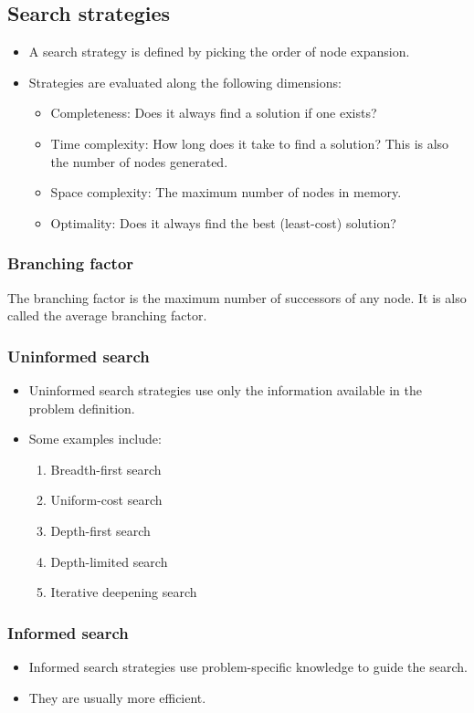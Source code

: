 \documentclass[11pt]{article}
\begin{document}
\subsection{Search strategies}
\label{sec:org9131353}
\begin{itemize}
\item A search strategy is defined by picking the order of node expansion.
\item Strategies are evaluated along the following dimensions:
\begin{itemize}
\item Completeness: Does it always find a solution if one exists?
\item Time complexity: How long does it take to find a solution? This is also the number of nodes generated.
\item Space complexity: The maximum number of nodes in memory.
\item Optimality: Does it always find the best (least-cost) solution?
\end{itemize}
\end{itemize}
\subsubsection{Branching factor}
\label{sec:orgf29b1f4}
The branching factor is the maximum number of successors of any node. It is also called the average branching factor.
\subsubsection{Uninformed search}
\label{sec:org2c3397c}
\begin{itemize}
\item Uninformed search strategies use only the information available in the problem definition.
\item Some examples include:
\begin{enumerate}
\item Breadth-first search
\item Uniform-cost search
\item Depth-first search
\item Depth-limited search
\item Iterative deepening search
\end{enumerate}
\end{itemize}
\subsubsection{Informed search}
\label{sec:org3431916}
\begin{itemize}
\item Informed search strategies use problem-specific knowledge to guide the search.
\item They are usually more efficient.
\end{itemize}
\end{document}
